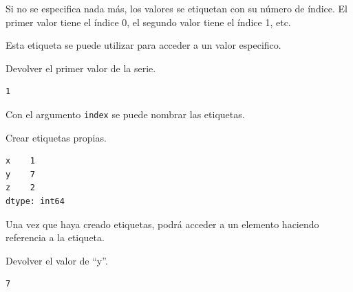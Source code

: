 Si no se especifica nada más, los valores se etiquetan con su número de
índice. El primer valor tiene el índice 0, el segundo valor tiene el
índice 1, etc.

Esta etiqueta se puede utilizar para acceder a un valor especifico.\\

\begin{code} Devolver el primer valor de la serie.

\begin{Shaded}
\begin{Highlighting}[]
\NormalTok{(myvar[}\NormalTok{])}
\end{Highlighting}
\end{Shaded}

\begin{verbatim}
1
\end{verbatim}
\end{code}

Con el argumento \texttt{index} se puede nombrar las etiquetas.\\

\begin{code} Crear etiquetas propias.

\begin{Shaded}
\begin{Highlighting}[]

\OperatorTok{=}\NormalTok{ [}\NormalTok{, }\NormalTok{, }\NormalTok{]}

\OperatorTok{=}\OperatorTok{=}\NormalTok{ [}\NormalTok{, }\NormalTok{, }\NormalTok{])}

\end{Highlighting}
\end{Shaded}

\begin{verbatim}
x    1
y    7
z    2
dtype: int64
\end{verbatim}
\end{code}

Una vez que haya creado etiquetas, podrá acceder a un elemento haciendo referencia a la etiqueta.\\

\begin{code} Devolver el valor de ``y''.

\begin{Shaded}
\begin{Highlighting}[]
\NormalTok{(myvar[}\NormalTok{])}
\end{Highlighting}
\end{Shaded}

\begin{verbatim}
7
\end{verbatim}
\end{code}

